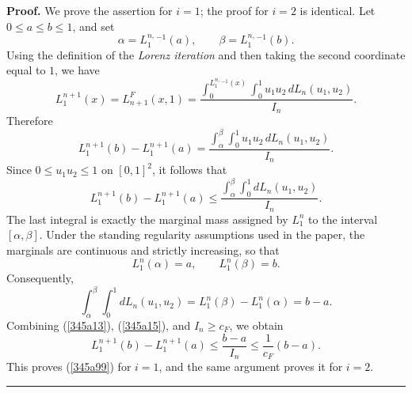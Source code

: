 \documentclass[onecolumn]{article}
\newenvironment{proof}[1][Proof]{\noindent\textbf{#1.} }{\ \rule{0.5em}{0.5em}}
\begin{document}
\begin{proof}
\noindent We prove the assertion for $i=1$; the proof for $i=2$ is
identical. Let $0\leq a\leq b\leq 1$, and set 
\begin{equation}
\alpha =L_{1}^{n,}{}^{-1}(a),\qquad \beta =L_{1}^{n,}{}^{-1}(b).
\label{345a10}
\end{equation}%
Using the definition of the \textit{Lorenz iteration} and then taking the
second coordinate equal to $1$, we have 
\begin{equation}
L_{1}^{n+1}(x)=L_{n+1}^{F}(x,1)=\frac{\int_{0}^{L_{1}^{n,}{}^{-1}(x)}%
\int_{0}^{1}u_{1}u_{2}\,dL_{n}(u_{1},u_{2})}{I_{n}}.  \label{345a11}
\end{equation}%
Therefore 
\begin{equation}
L_{1}^{n+1}(b)-L_{1}^{n+1}(a)=\frac{\int_{\alpha }^{\beta
}\int_{0}^{1}u_{1}u_{2}\,dL_{n}(u_{1},u_{2})}{I_{n}}.  \label{345a12}
\end{equation}%
Since $0\leq u_{1}u_{2}\leq 1$ on $[0,1]^{2}$, it follows that 
\begin{equation}
L_{1}^{n+1}(b)-L_{1}^{n+1}(a)\leq \frac{\int_{\alpha }^{\beta
}\int_{0}^{1}dL_{n}(u_{1},u_{2})}{I_{n}}.  \label{345a13}
\end{equation}%
The last integral is exactly the marginal mass assigned by $L_{1}^{n}$ to
the interval $[\alpha ,\beta ]$. Under the standing regularity assumptions
used in the paper, the marginals are continuous and strictly increasing, so
that 
\begin{equation}
L_{1}^{n}(\alpha )=a,\qquad L_{1}^{n}(\beta )=b.  \label{345a14}
\end{equation}%
Consequently, 
\begin{equation}
\int_{\alpha }^{\beta }\int_{0}^{1}dL_{n}(u_{1},u_{2})=L_{1}^{n}(\beta
)-L_{1}^{n}(\alpha )=b-a.  \label{345a15}
\end{equation}%
Combining (\ref{345a13}), (\ref{345a15}), and $I_{n}\geq c_{F}$, we obtain 
\begin{equation}
L_{1}^{n+1}(b)-L_{1}^{n+1}(a)\leq \frac{b-a}{I_{n}}\leq \frac{1}{c_{F}}(b-a).
\label{345a16}
\end{equation}%
This proves (\ref{345a99}) for $i=1$, and the same argument proves it for $%
i=2$.
\end{proof}
\end{document}
